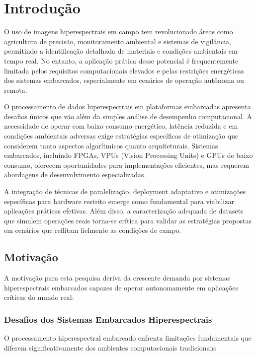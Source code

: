 \chapter{Introdução}\label{chp:Introducao}

O uso de imagens hiperespectrais em campo tem revolucionado áreas como agricultura de precisão, monitoramento ambiental e sistemas de vigilância, permitindo a identificação detalhada de materiais e condições ambientais em tempo real. No entanto, a aplicação prática desse potencial é frequentemente limitada pelos requisitos computacionais elevados e pelas restrições energéticas dos sistemas embarcados, especialmente em cenários de operação autônoma ou remota.

O processamento de dados hiperespectrais em plataformas embarcadas apresenta desafios únicos que vão além da simples análise de desempenho computacional. A necessidade de operar com baixo consumo energético, latência reduzida e em condições ambientais adversas exige estratégias específicas de otimização que considerem tanto aspectos algorítmicos quanto arquiteturais. Sistemas embarcados, incluindo FPGAs, VPUs (Vision Processing Units) e GPUs de baixo consumo, oferecem oportunidades para implementações eficientes, mas requerem abordagens de desenvolvimento especializadas.

A integração de técnicas de paralelização, deployment adaptativo e otimizações específicas para hardware restrito emerge como fundamental para viabilizar aplicações práticas efetivas. Além disso, a caracterização adequada de datasets que simulem operações reais torna-se crítica para validar as estratégias propostas em cenários que reflitam fielmente as condições de campo.

\section{Motivação}\label{sec:motivacao}

A motivação para esta pesquisa deriva da crescente demanda por sistemas hiperespectrais embarcados capazes de operar autonomamente em aplicações críticas do mundo real:

\subsection{Desafios dos Sistemas Embarcados Hiperespectrais}
O processamento hiperespectral embarcado enfrenta limitações fundamentais que diferem significativamente dos ambientes computacionais tradicionais:

